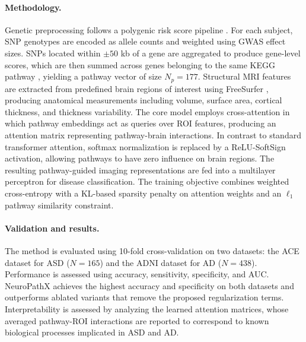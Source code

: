 \paragraph{Methodology.}
Genetic preprocessing follows a polygenic risk score pipeline \cite{unknown}. For each subject, SNP genotypes are encoded as allele counts and weighted using GWAS effect sizes. SNPs located within $\pm 50$ kb of a gene are aggregated to produce gene-level scores, which are then summed across genes belonging to the same KEGG pathway \cite{10.1093/nar/28.1.27}, yielding a pathway vector of size $N_p=177$. Structural MRI features are extracted from predefined brain regions of interest using FreeSurfer \cite{FISCHL2012774}, producing anatomical measurements including volume, surface area, cortical thickness, and thickness variability. The core model employs cross-attention in which pathway embeddings act as queries over ROI features, producing an attention matrix representing pathway-brain interactions. In contrast to standard transformer attention, softmax normalization is replaced by a ReLU-SoftSign activation, allowing pathways to have zero influence on brain regions. The resulting pathway-guided imaging representations are fed into a multilayer perceptron for disease classification. The training objective combines weighted cross-entropy with a KL-based sparsity penalty on attention weights and an $\ell_1$ pathway similarity constraint.

\paragraph{Validation and results.}
The method is evaluated using 10-fold cross-validation on two datasets: the ACE dataset for ASD ($N=165$) and the ADNI dataset for AD ($N=438$). Performance is assessed using accuracy, sensitivity, specificity, and AUC. NeuroPathX achieves the highest accuracy and specificity on both datasets and outperforms ablated variants that remove the proposed regularization terms. Interpretability is assessed by analyzing the learned attention matrices, whose averaged pathway-ROI interactions are reported to correspond to known biological processes implicated in ASD and AD.
